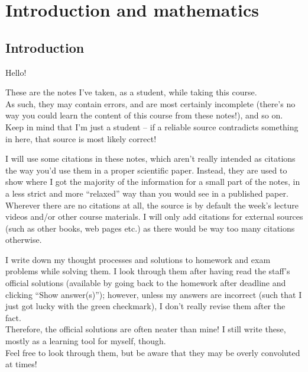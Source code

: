 \documentclass[12pt,a4paper]{report}
\begin{document}
\maketitle

\tableofcontents

\part{Introduction and mathematics}

\chapter{Introduction}

Hello!

These are the notes I've taken, as a student, while taking this course.\\
As such, they may contain errors, and are most certainly incomplete (there's no way you could learn the content of this course from these notes!), and so on. Keep in mind that I'm just a student -- if a reliable source contradicts something in here, that source is most likely correct!

I will use some citations in these notes, which aren't really intended as citations the way you'd use them in a proper scientific paper. Instead, they are used to show where I got the majority of the information for a small part of the notes, in a less strict and more ``relaxed'' way than you would see in a published paper.\\
Wherever there are no citations at all, the source is by default the week's lecture videos and/or other course materials. I will only add citations for external sources (such as other books, web pages etc.) as there would be way too many citations otherwise.

I write down my thought processes and solutions to homework and exam problems while solving them. I look through them after having read the staff's official solutions (available by going back to the homework after deadline and clicking ``Show answer(s)''); however, unless my answers are incorrect (such that I just got lucky with the green checkmark), I don't really revise them after the fact.\\
Therefore, the official solutions are often neater than mine! I still write these, mostly as a learning tool for myself, though.\\
Feel free to look through them, but be aware that they may be overly convoluted at times!
\end{document}
